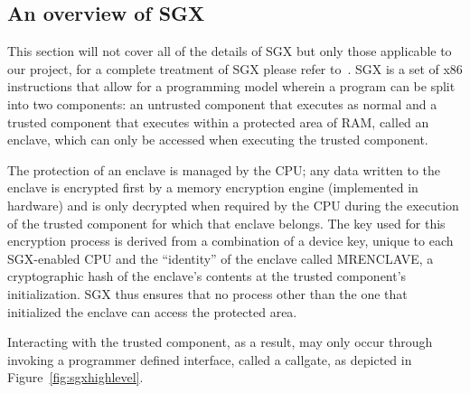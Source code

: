 \documentclass[../main.tex]{subfiles}
\begin{document}
\subsection{An overview of \Intel SGX} 
This section will not cover all of the details of SGX but only those applicable to our project, for a complete treatment of SGX please refer to~\cite{IntelCorporation2010}. \Intel SGX is a set of x86 instructions that allow for a programming model wherein a program can be split into two components: an untrusted component that executes as normal and a trusted component that executes within a protected area of RAM, called an enclave, which can only be accessed when executing the trusted component. 

The protection of an enclave is managed by the CPU; any data written to the enclave is encrypted first by a memory encryption engine (implemented in hardware) and is only decrypted when required by the CPU during the execution of the trusted component for which that enclave belongs. The key used for this encryption process is derived from a combination of a device key, unique to each SGX-enabled CPU and the ``identity'' of the enclave called MRENCLAVE, a cryptographic hash of the enclave's contents at the trusted component's initialization. SGX thus ensures that no process other than the one that initialized the enclave can access the protected area. 

Interacting with the trusted component, as a result, may only occur through invoking a programmer defined interface, called a callgate, as depicted in Figure~\ref{fig:sgxhighlevel}.
\end{document}
